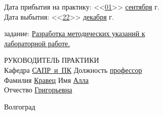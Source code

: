 \documentclass[a4paper, 14pt]{extreport}
\begin{document}
\begin{titlepage}
\begin{flushleft}
            Дата прибытия на практику: <<\underline{01}>> \underline{сентября\hspace{1.2cm}} 
            \the\year г.\\
            Дата выбытия: \hspace{3cm}<<\underline{22}>> \underline{декабря\hspace{1.4cm}} 
            \the\year г.
        \end{flushleft}
        \vspace{1cm}
         задание: \underline{Разработка методических указаний к\hspace{2.5cm}}\\
        \underline{лабораторной работе.\hspace{11.65cm}}\\
        \vspace{1cm}
        \begin{flushleft}
            РУКОВОДИТЕЛЬ ПРАКТИКИ\\
            Кафедра \underline{САПР~и~ПК\hspace{2.4cm}} Должность \underline{профессор\hspace{2.8cm}} \\
            Фамилия \underline{Кравец\hspace{3.3cm}} Имя \underline{Алла\hspace{5.5cm}}\\
            Отчество \underline{Григорьевна\hspace{2.2cm}}
        \end{flushleft}
        \vspace{\fill}
        \begin{center}
            Волгоград \the\year
        \end{center}
    \end{titlepage}
\end{document}
